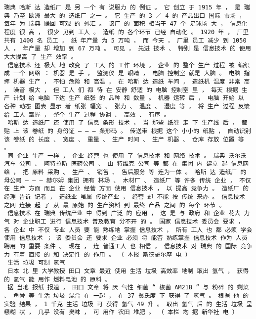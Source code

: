 \documentclass{article}
\begin{document}
\begin{Verbatim}[commandchars=\\\{\}]
 瑞典 哈斯 达 造纸厂 是 另 一个 有 说服力 的 例证 。 它 创立 于 1915 年 ， 是 瑞典 乃至 欧洲 最大 的 造纸厂 之一 。 它 生产 的 3 ／ 4 的 产品出口 国际 市场 ， 每年 为 瑞典 赚回 可观 的 外汇 。 该厂 的 面积 相当于 47 个 足球场 大 ， 信息化 程度 很 高 ， 很少 见到 工人 。 造纸 的 各个环节 已经 自动化 。 1920 年 ， 厂里 共有 1400 名 员工 ， 纸 年产量 为 5 万吨 ， 而 今天 ， 厂里 员工 减少 到 1050 人 ， 年产量 却 增加 到 67 万吨 。 可见 ， 先进 技术 、 特别 是 信息技术 的 使用 大大提高 了 生产 效率 。 
 信息技术 还 极大 地 改变 了 工人 的 工作 环境 。 企业 的 整个 生产 过程 被 编织成 一个 网络 ： 机器 是 手 ， 监测仪 是 眼睛 ， 电脑 控制室 就是 大脑 。 电脑 指挥 机器 生产 ， 不怕 危险 和 高温 ， 在 哈斯 达 造纸 车间 ， 造纸机 温度 非常 高 ， 噪音 极大 ， 但 工人 们 都 待 在 安静 舒适 的 电脑 控制室 里 ， 每天 根据 生产 计划 给 电脑 下达 生产 纸张 的 品种 和 数量 。 机器 运转 后 ， 电脑 开始 以 各种 动态 图表 显示 着 纸张 幅宽 、 张力 、 温度 、 湿度 等 ， 将 生产 过程 反馈 给 工人 掌握 ， 整个 生产 过程 协调 、 高效 、 有序 。 
 哈斯 达 造纸厂 还 使用 了 信息 条形 技术 ， 当 那些 纸卷 走 下 生产线 后 ， 都 贴 上 该 卷纸 的 身份证 — — — 条形码 。 传送带 根据 这个 小小的 纸贴 ， 自动识别 该 卷纸 的 长度 、 宽度 、 重量 、 生产 时间 、 生产 机器 、 仓库 存放 位置 等 。 
 同 企业 生产 一样 ， 企业 经营 也 使用 了 信息技术 和 网络 技术 。 瑞典 沃尔沃 汽车 公司 、 阿特拉斯 医药公司 、 山 特维克 公司 等 都 在 集团 内 建立 起 信息网络 ， 把 原料 采购 、 生产 、 销售 、 售后服务 等 连为一体 。 哈斯 达 造纸厂 的 母公司 — — — 赫尔姆 集团 拥有 林场 、 木材厂 、 造纸厂 等 许多 传统 企业 ， 不仅 在 生产 方面 而且 在 企业 经营 方面 使用 信息技术 ， 以 提高 竞争力 。 造纸厂 的 经理 告诉 记者 ， 造纸业 虽属 传统产业 ， 经营 却 不能 按 传统 来办 。 信息技术 之网 连接 起 了 从 最 原始 的 生产资料 到 最终 产品 之间 的 每个 环节 。 
 信息技术 在 瑞典 传统产业 中 得到 广泛 的 应用 ， 这 是 与 政府 和 企业 花大 力气 对 企业职工 进行 信息技术 普及教育 分不开 的 。 国家 信息技术 委员会 要求 ， 各 企业 中 不仅 专业 人员 要 能 熟练地 掌握 信息技术 ， 所有 工人 也 都 必须 学会 使用 信息技术 ； 该 委员会 还 要求 企业 必须 将 能否 熟练掌握 信息技术 作为 人员 聘用 的 重要 条件 。 现在 ， 连 普通工人 也 相信 ， 信息技术 对 瑞典 的 国际 竞争力 有着 直接 的 和 决定性 的 作用 。 （ 本报 斯德哥尔摩 电 ） 
 生活 垃圾 可制 氢气 
 日本 北 里 大学教授 田口 文章 最近 使用 生活 垃圾 高效率 地制 取出 氢气 ， 获得 的 氢气 能 用作 燃料电池 的 原料 。 
 据 当地 报纸 报道 ， 田口 文章 将 厌 气性 细菌 “ 梭菌 AM21B ” 与 粉碎 的 剩菜 、 鱼骨 等 生活 垃圾 混合 在 一起 ， 在 37 摄氏度 下 获得 了 氢气 。 根据 他 的 实验 结果 ， 1 千克 生活 垃圾 可 获得 氢气 49 升 。 取出 氢气 后 的 生活 垃圾 呈 糨糊 状 ， 几乎 没有 臭味 ， 可 用作 农田 堆肥 。 （ 本栏 均 据 新华社 电 ） 

\end{Verbatim}
\end{document}
